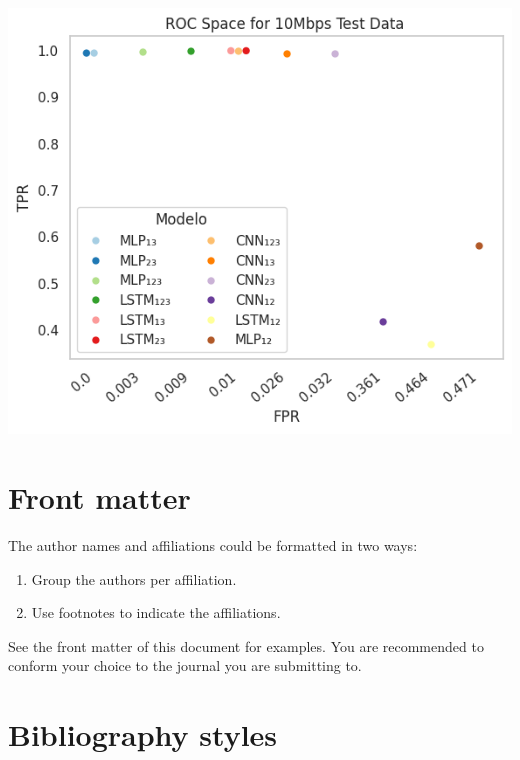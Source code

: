 \documentclass[a4paper,fleqn]{cas-sc}
\begin{document}
\begin{minipage}{0.45\textwidth}
\begin{minipage}{0.30\textwidth}
		\label{fig:ROCDesempenhoteste10Mbps}	
	\end{minipage}
	\hfill
	\begin{minipage}{0.30\textwidth}
		\centering
		\includegraphics[width=1.0\textwidth]{./figs/ROC-Space-Test-Data-10Mbps.png}
		\label{fig:ROCDesempenhoteste10Mbps}	
	\end{minipage}
	\hfill
	
\end{minipage}










\section{Front matter}

The author names and affiliations could be formatted in two ways:
\begin{enumerate}[(1)]
\item Group the authors per affiliation.
\item Use footnotes to indicate the affiliations.
\end{enumerate}
See the front matter of this document for examples. 
You are recommended to conform your choice to the journal you 
are submitting to.

\section{Bibliography styles}
\end{document}

